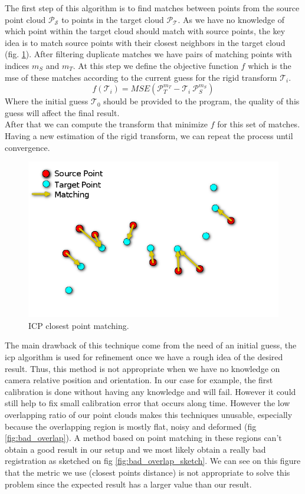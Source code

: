 The first step of this algorithm is to find matches between points from the source point cloud $\mathcal{P_S}$ to points in the target cloud $\mathcal{P_T}$. As we have no knowledge of which point within the target cloud should match with source points, the key idea is to match source points with their closest neighbors in the target cloud (fig. \ref{fig:closest_point}). After filtering duplicate matches we have pairs of matching points with indices $m_S$ and $m_T$. At this step we define the objective function $f$ which is the \acrfull{mse} of these matches according to the current guess for the rigid transform $\mathcal{T}_{i}$. \\
\[
    f(\mathcal{T}_i) = MSE(\mathcal{P}_T^{m_T} - \mathcal{T}_i\: \mathcal{P}_S^{m_S})
\]
Where the initial guess $\mathcal{T}_0$ should be provided to the program, the quality of this guess will affect the final result. \\
After that we can compute the transform that minimize $f$ for this set of matches. Having a new estimation of the rigid transform, we can repeat the process until convergence. 

\begin{figure}[h!]
    \centering
    \includegraphics[width=\textwidth]{images/closest_point.png}
    \caption{ICP closest point matching.}
    \label{fig:closest_point}
\end{figure}

The main drawback of this technique come from the need of an initial guess, the \acrshort{icp} algorithm is used for refinement once we have a rough idea of the desired result. Thus, this method is not appropriate when we have no knowledge on camera relative position and orientation. In our case for example, the first calibration is done without having any knowledge and will fail. However it could still help to fix small calibration error that occurs along time. However the low overlapping ratio of our point clouds makes this techniques unusable, especially because the overlapping region is mostly flat, noisy and deformed (fig \ref{fig:bad_overlap}). A method based on point matching in these regions can't obtain a good result in our setup and we most likely obtain a really bad registration as sketched on fig \ref{fig:bad_overlap_sketch}. We can see on this figure that the metric we use (closest points distance) is not appropriate to solve this problem since the expected result has a larger value than our result. \\

